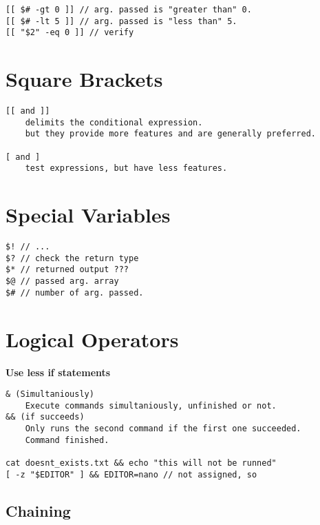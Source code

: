 \begin{verbatim}
[[ $# -gt 0 ]] // arg. passed is "greater than" 0.
[[ $# -lt 5 ]] // arg. passed is "less than" 5.
[[ "$2" -eq 0 ]] // verify 
\end{verbatim}

\section{Square Brackets}

\begin{verbatim}
[[ and ]] 
    delimits the conditional expression. 
    but they provide more features and are generally preferred.

[ and ]
    test expressions, but have less features.
\end{verbatim}

\section{Special Variables}

\begin{verbatim}
$! // ... 
$? // check the return type
$* // returned output ???
$@ // passed arg. array 
$# // number of arg. passed.
\end{verbatim}

\section{Logical Operators}

\textbf{Use less if statements}

\begin{verbatim}
& (Simultaniously)
    Execute commands simultaniously, unfinished or not.
&& (if succeeds)
    Only runs the second command if the first one succeeded.
    Command finished.

cat doesnt_exists.txt && echo "this will not be runned" 
[ -z "$EDITOR" ] && EDITOR=nano // not assigned, so
\end{verbatim}

\subsection{Chaining}

